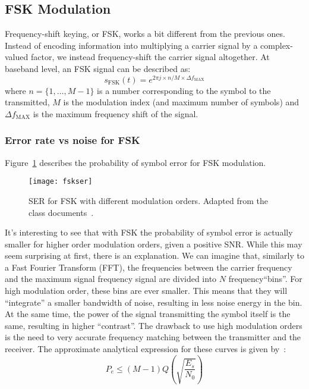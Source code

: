 \subsection{FSK Modulation}

Frequency-shift keying, or FSK, works a bit different from the previous ones.
Instead of encoding information into multiplying a carrier signal by a
complex-valued factor, we instead frequency-shift the carrier signal altogether.
At baseband level, an FSK signal can be described as:
\begin{equation}
    s_{\text{FSK}}(t) = e^{2\pi j\times n/M \times \Delta f_{\text{MAX}}}
\end{equation}
where \(n = \{1,\ldots,M-1\}\) is a number corresponding to the symbol to the
transmitted, \(M\) is the modulation index (and maximum number of symbols) and
\(\Delta f_{\text{MAX}}\) is the maximum frequency shift of the signal.

\subsubsection{Error rate vs noise for FSK}

Figure~\ref{fig:fskser} describes the probability of symbol error for FSK
modulation.
\begin{figure}
    \centering
    \texttt{[image: fskser]}
    \caption{SER for FSK with different modulation orders. Adapted from the class
        documents~\cite{slidesaulas}\label{fig:fskser}.}
\end{figure}
It's interesting to see that with FSK the probability of symbol error is actually
smaller for higher order modulation orders, given a positive SNR\@. While this may
seem surprising at first, there is an explanation. We can imagine that, similarly
to a Fast Fourier Transform (FFT), the frequencies between the carrier frequency
and the maximum signal frequency signal are divided into \(N\) frequency``bins''.
For high modulation order, these bins are ever smaller. This means that they will
``integrate'' a smaller bandwidth of noise, resulting in less noise energy in the
bin. At the same time, the power of the signal transmitting the symbol itself is
the same, resulting in higher ``contrast''. The drawback to use high modulation
orders is the need to very accurate frequency matching between the transmitter and
the receiver. The approximate analytical expression for these curves is given
by~\cite{slidesaulas}:
\begin{equation}
    P_e \leqslant (M-1)Q\left( \sqrt{\frac{E_s}{N_0}} \right)
\end{equation}


